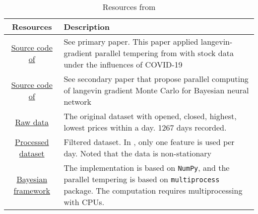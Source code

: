 \documentclass[a4paper]{article}
\begin{document}
\begin{table}[h]
    \centering
    \begin{tabularx}{\textwidth}{cX}
       \textbf{Resources} & \textbf{Description} \\
       \hline
       \href{https://github.com/sydney-machine-learning/Bayesianneuralnet_stockmarket}{Source code  of \cite{chandra2021bayesian}} & See primary paper\cite{chandra2021bayesian}. This paper applied langevin-gradient parallel tempering from \cite{chandra2019langevin} with stock data under the influences of COVID-19\\\hline
       \href{https://github.com/sydney-machine-learning/parallel-tempering-neural-net}{Source code of \cite{chandra2019langevin}} & See secondary paper\cite{chandra2019langevin} that propose parallel computing of langevin gradient Monte Carlo for Bayesian neural network\\\hline
        \href{https://github.com/sydney-machine-learning/Bayesianneuralnet_stockmarket/blob/master/code/datasets/raw/DAI.DE.csv}{Raw data}  & The original dataset with opened, closed, highest, lowest prices within a day. 1267 days recorded.  \\\hline
       \href{https://github.com/sydney-machine-learning/Bayesianneuralnet_stockmarket/blob/master/code/datasets/600118.SS_1_train.txt}{Processed dataset}  & Filtered dataset. In \cite{chandra2021bayesian}, only one feature is used per day. Noted that the data is non-stationary  \\\hline
       \href{https://github.com/sydney-machine-learning/Bayesianneuralnet_stockmarket/blob/6d24cf25115b6517e3099249bc657674f6b9b98f/code/pt_timeseries_regression.py\#L36-L142}{Bayesian framework} & The implementation is based on \texttt{NumPy}, and the parallel tempering is based on \texttt{multiprocess} package. The computation requires multiprocessing with CPUs.\\
    \end{tabularx}
    \caption{Resources from \cite{chandra2021bayesian}}
    \label{tab:my_label}
\end{table}


\end{document}
